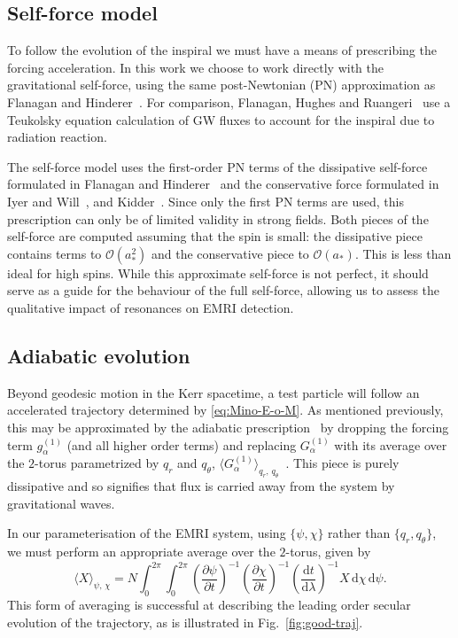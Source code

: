 \documentclass[aps,prd,amsfonts,amssymb,amsmath,nofootinbib,reprint,showpacs]{revtex4}
\newcommand{\figref}[1]{Fig.\ \ref{fig:#1}}
\newcommand{\dd}{\ensuremath{\mathrm{d}}}
\newcommand{\diff}[2]{\ensuremath{\dfrac{\dd {#1}}{\dd {#2}}}}
\newcommand{\partialdiff}[2]{\ensuremath{\dfrac{\partial {#1}}{\partial {#2}}}}
\newcommand{\intd}[4]{\ensuremath{\int_{#1}^{#2}{#3}\,\dd{#4}}}
\newcommand{\order}[1]{\ensuremath{\mathcal{O}({#1})}}
\begin{document}
\subsection{Self-force model}
\label{sec:self-force}

To follow the evolution of the inspiral we must have a means of prescribing the forcing acceleration. In this work we choose to work directly with the gravitational self-force, using the same post-Newtonian (PN) approximation as Flanagan and Hinderer~\cite{Flanagan2012}. For comparison, Flanagan, Hughes and Ruangeri~\cite{Flanagan2012a} use a Teukolsky equation calculation of GW fluxes to account for the inspiral due to radiation reaction.

The self-force model uses the first-order PN terms of the dissipative self-force formulated in Flanagan and Hinderer~\cite{Flanagan2007} and the conservative force formulated in Iyer and Will~\cite{Iyer1993}, and Kidder~\cite{Kidder1995}. Since only the first PN terms are used, this prescription can only be of limited validity in strong fields. Both pieces of the self-force are computed assuming that the spin is small: the dissipative piece contains terms to $\order{a_\ast^2}$ and the conservative piece to $\order{a_\ast}$. This is less than ideal for high spins. While this approximate self-force is not perfect, it should serve as a guide for the behaviour of the full self-force, allowing us to assess the qualitative impact of resonances on EMRI detection.

\subsection{Adiabatic evolution}

Beyond geodesic motion in the Kerr spacetime, a test particle will follow an accelerated trajectory determined by \ref{eq:Mino-E-o-M}. As mentioned previously, this may be approximated by the adiabatic prescription~\cite{Hinderer2008} by dropping the forcing term $g_\alpha^{(1)}$ (and all higher order terms) and replacing $G_\alpha^{(1)}$ with its average over the $2$-torus parametrized by $q_r$ and $q_\theta$, $\langle G_\alpha^{(1)}\rangle_{q_r,\,q_\theta}$~\cite{Drasco2005}. This piece is purely dissipative and so signifies that flux is carried away from the system by gravitational waves.

In our parameterisation of the EMRI system, using $\{\psi,\chi\}$ rather than $\{q_r,q_\theta\}$, we must perform an appropriate average over the $2$-torus, given by
\begin{equation}
\label{eq:2torus-average}
\langle X\rangle_{\psi,\,\chi} = N \intd{0}{2\pi}{ \intd{0}{2\pi}{ \left(\partialdiff{\psi}{t}\right)^{-1} \left(\partialdiff{\chi}{t}\right)^{-1} \left(\diff{t}{\lambda}\right)^{-1} X }{\chi} }{\psi} .
\end{equation}
This form of averaging is successful at describing the leading order secular evolution of the trajectory, as is illustrated in \figref{good-traj}.
\end{document}
